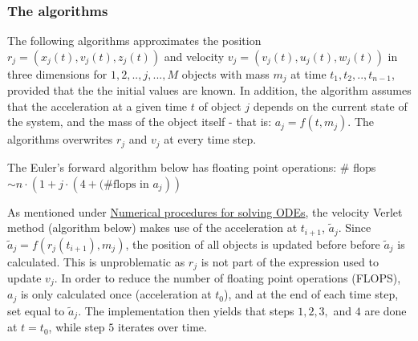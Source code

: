 \documentclass[%
oneside,                 %
final,                   %
10pt]{article}
\begin{document}
\subsubsection*{The algorithms}
\label{subsec:algos}
The following algorithms approximates the position $r_j=(x_j(t),v_j(t),z_j(t))$ and velocity $v_j=(v_j(t),u_j(t),w_j(t))$ in three dimensions for $1,2,..,j,...,M$ objects with mass $m_j$ at time $t_1, t_2,..,t_{n-1}$, provided that the the initial values are known. In addition, the algorithm assumes that the acceleration at a given time $t$ of object $j$ depends on the current state of the system, and the mass of the object itself - that is: $a_j=f(t,m_j)$. The algorithms overwrites $r_j$ and $v_j$ at every time step. \newline

The Euler's forward algorithm below has floating point operations: \newline
\# flops$\sim n \cdot (1+j \cdot (4+\text{(\#flops in } a_j))$

\begin{center}\end{center}

As mentioned under \hyperref[sec:NPs]{Numerical procedures for solving ODEs}, the velocity Verlet method (algorithm below) makes use of the acceleration at $t_{i+1}$, $\tilde{a}_j$. Since $\tilde{a}_j=f(r_j(t_{i+1}),m_j)$, the position of all objects is updated before before $\tilde{a}_j$ is calculated. This is unproblematic as $r_j$ is not part of the expression used to update $v_j$. In order to reduce the number of floating point operations (FLOPS), $a_j$ is only calculated once (acceleration at $t_0$), and at the end of each time step, set equal to $\tilde{a}_j$. The implementation then yields that steps $1,2,3,$ and $4$ are done at $t=t_0$, while step $5$ iterates over time. \newline
\end{document}
